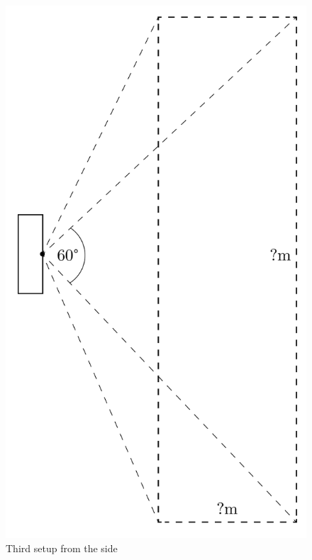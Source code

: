 \documentclass[../thesis/thesis.tex]{subfiles}
\begin{document}
 \begin{figure}
 \centering
 \includegraphics[height=0.8\textheight,page=2]{../diagrams/third-exp-setup.pdf}
 \caption{Third setup from the side}
 \label{fig:exps:3setupside}
 \end{figure}

\end{document}
